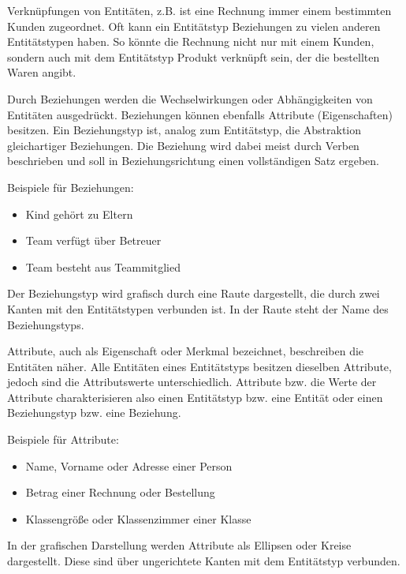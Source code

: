 \begin{tcolorbox}[title=Beziehungen]
	Verknüpfungen von Entitäten, z.B. ist eine Rechnung immer einem bestimmten Kunden zugeordnet. Oft kann ein Entitätstyp Beziehungen zu vielen anderen Entitätstypen haben. So könnte die Rechnung nicht nur mit einem Kunden, sondern auch mit dem Entitätstyp Produkt verknüpft sein, der die bestellten Waren angibt.

	Durch Beziehungen werden die Wechselwirkungen oder Abhängigkeiten von Entitäten ausgedrückt. Beziehungen können ebenfalls Attribute (Eigenschaften) besitzen. Ein Beziehungstyp ist, analog zum Entitätstyp, die Abstraktion gleichartiger Beziehungen. Die Beziehung wird dabei meist durch Verben beschrieben und soll in Beziehungsrichtung einen vollständigen Satz ergeben.

	Beispiele für Beziehungen:
	\begin{itemize}
		\item Kind gehört zu Eltern
		\item Team verfügt über Betreuer
		\item Team besteht aus Teammitglied
	\end{itemize}
	Der Beziehungstyp wird grafisch durch eine Raute dargestellt, die durch zwei Kanten mit den Entitätstypen verbunden ist. In der Raute steht der Name des Beziehungstyps.
\end{tcolorbox}
\begin{tcolorbox}[title=Attribute]
	Attribute, auch als Eigenschaft oder Merkmal bezeichnet, beschreiben die Entitäten näher. Alle Entitäten eines Entitätstyps besitzen dieselben Attribute, jedoch sind die Attributswerte unterschiedlich. Attribute bzw. die Werte der Attribute charakterisieren also einen Entitätstyp bzw. eine Entität oder einen Beziehungstyp bzw. eine Beziehung.

	Beispiele für Attribute:
	\begin{itemize}
		\item Name, Vorname oder Adresse einer Person
		\item Betrag einer Rechnung oder Bestellung
		\item Klassengröße oder Klassenzimmer einer Klasse
	\end{itemize}
	In der grafischen Darstellung werden Attribute als Ellipsen oder Kreise dargestellt. Diese sind über ungerichtete Kanten mit dem Entitätstyp verbunden.
\end{tcolorbox}
